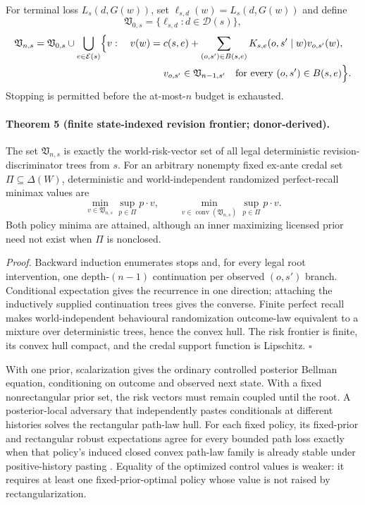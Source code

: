 For terminal loss $L_s(d,G(w))$, set
$\ell_{s,d}(w)=L_s(d,G(w))$ and define
\[
 \mathfrak V_{0,s}=\{\ell_{s,d}:d\in\mathcal D(s)\},
\]
\[
\begin{aligned}
 \mathfrak V_{n,s}=\mathfrak V_{0,s}\cup
 \bigcup_{e\in\mathcal E(s)}\Bigl\{v:\quad
 v(w)={}&c(s,e)+\sum_{(o,s')\in B(s,e)}
     K_{s,e}(o,s'\mid w)v_{o,s'}(w),\\
 &v_{o,s'}\in\mathfrak V_{n-1,s'}
 \quad\text{for every }(o,s')\in B(s,e)\Bigr\}.
\end{aligned}
\]
Stopping is permitted before the at-most-$n$ budget is exhausted.

\paragraph{Theorem 5 (finite state-indexed revision frontier;
donor-derived).}
The set $\mathfrak V_{n,s}$ is exactly the world-risk-vector set of all legal
deterministic revision-discriminator trees from $s$.  For an arbitrary
nonempty fixed ex-ante credal set $\Pi\subseteq\Delta(W)$, deterministic and
world-independent randomized perfect-recall minimax values are
\[
 \min_{v\in\mathfrak V_{n,s}}\sup_{p\in\Pi}p\!\cdot\!v,
 \qquad
 \min_{v\in\operatorname{conv}(\mathfrak V_{n,s})}
      \sup_{p\in\Pi}p\!\cdot\!v.
\]
Both policy minima are attained, although an inner maximizing licensed prior
need not exist when $\Pi$ is nonclosed.

\emph{Proof.} Backward induction enumerates stops and, for every legal root
intervention, one depth-$(n-1)$ continuation per observed $(o,s')$ branch.
Conditional expectation gives the recurrence in one direction; attaching the
inductively supplied continuation trees gives the converse.  Finite perfect
recall makes world-independent behavioural randomization outcome-law
equivalent to a mixture over deterministic trees, hence the convex hull.  The
risk frontier is finite, its convex hull compact, and the credal support
function is Lipschitz. \hfill$\square$

With one prior, scalarization gives the ordinary controlled posterior Bellman
equation, conditioning on outcome and observed next state.  With a fixed
nonrectangular prior set, the risk vectors must remain coupled until the root.
A posterior-local adversary that independently pastes conditionals at different
histories solves the rectangular path-law hull.  For each fixed policy, its
fixed-prior and rectangular robust expectations agree for every bounded path
loss exactly when that policy's induced closed convex path-law family is already
stable under positive-history pasting \cite{epstein2003}. Equality of the
optimized control values is weaker: it requires at least one fixed-prior-optimal
policy whose value is not raised by rectangularization.


